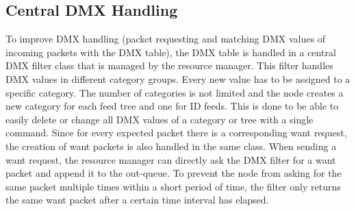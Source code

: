 \subsection{Central DMX Handling}
To improve DMX handling (packet requesting and matching DMX values of incoming packets with the DMX table), the DMX table is handled in a central DMX filter class that is managed by the resource manager. This filter handles DMX values in different category groups. Every new value has to be assigned to a specific category. The number of categories is not limited and the node creates a new category for each feed tree and one for ID feeds. This is done to be able to easily delete or change all DMX values of a category or tree with a single command. Since for every expected packet there is a corresponding want request, the creation of want packets is also handled in the same class. When sending a want request, the resource manager can directly ask the DMX filter for a want packet and append it to the out-queue. To prevent the node from asking for the same packet multiple times within a short period of time, the filter only returns the same want packet after a certain time interval has elapsed.
